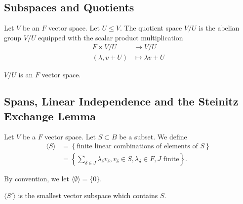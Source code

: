 \documentclass[12pt]{article}
\begin{document}
\subsection{Subspaces and Quotients}%
\label{sub:subspaces_and_quotients}

\begin{definition}[Quotient]
	Let $V$ be an $F$ vector space. Let $U \leq V$. The quotient space $V / U$ is the abelian group $V/U$ equipped with the scalar product multiplication
	\begin{align*}
		F \times V/U &\to V/U \\
		(\lambda, v + U) &\mapsto \lambda v + U
	\end{align*}
\end{definition}

\begin{proposition}
	$V/U$ is an $F$ vector space.
\end{proposition}

\subsection{Spans, Linear Independence and the Steinitz Exchange Lemma}%
\label{sub:spans_linear_independence_and_the_steinitz_exchange_lemma}

\begin{definition}
	Let $V$ be a $F$ vector space. Let $S \subset B$ be a subset. We define
	\begin{align*}
		\langle S \rangle &= \left\{ \text{finite linear combinations of elements of } S \right\} \\
				  &= \left\{ \sum_{\delta \in J} \lambda_{\delta} v_{\delta},  v_{\delta} \in S,  \lambda_{\delta} \in F, J \text{ finite} \right\}.
	\end{align*}
\end{definition}

By convention, we let $\langle \emptyset \rangle = \{0\}$.

\begin{remark}
	$\langle S' \rangle$ is the smallest vector subspace which contains $S$.
\end{remark}
\end{document}
